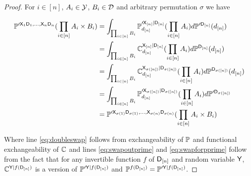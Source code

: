 \begin{proof}
For $i\in [n]$, $A_i\in \mathcal{Y}$, $B_i\in \mathcal{D}$ and arbitrary permutation $\sigma$ we have

\begin{align}
    \mathbb{P}^{\prime \mathsf{X}_{1}\mathsf{D}_1,...,\mathsf{X}_n\mathsf{D}_n}(\prod_{i\in[n]} A_i\times B_i) &= \int_{\prod_{i\in[n]}B_i} \mathbb{P}^{\prime \mathsf{X}_{[n]}|\mathsf{D}_{[n]}}_{d_{[n]}}(\prod_{i\in[n]} A_i) d\mathbb{P}^{\prime \mathsf{D}_{[n]}}(d_{[n]})\\
                                                                                             &= \int_{\prod_{i\in[n]}B_i} \mathbb{C}^{\mathsf{X}_{[n]}|\mathsf{D}_{[n]}}_{d_{[n]}}(\prod_{i\in[n]} A_i) d\mathbb{P}^{\mathsf{D}_{[n]}}(d_{[n]})\label{eq:swapoutprime}\\
                                                                                             &= \int_{\prod_{i\in[n]}B_i} \mathbb{C}^{\mathsf{X}_{\sigma([n])}|\mathsf{D}_{\sigma([n])}}_{d_{[n]}}(\prod_{i\in[n]} A_i) d\mathbb{P}^{\mathsf{D}_{\sigma([n])}}(d_{[n]})\label{eq:doubleswap}\\
                                                                                             &= \int_{\prod_{i\in[n]}B_i} \mathbb{P}^{\prime \mathsf{X}_{\sigma([n])}|\mathsf{D}_{\sigma([n])}}_{d_{[n]}}(\prod_{i\in[n]} A_i) d\mathbb{P}^{\prime \mathsf{D}_{\sigma([n])}}\label{eq:swapforpprime}\\
                                                                                             &= \mathbb{P}^{\prime \mathsf{X}_{\sigma(1)}\mathsf{D}_{\sigma(1)},...,\mathsf{X}_{\sigma(n)}\mathsf{D}_{\sigma(n)}}(\prod_{i\in[n]} A_i\times B_i)
\end{align}

Where line \ref{eq:doubleswap} follows from exchangeability of $\mathbb{P}$ and functional exchangeability of $\mathbb{C}$ and lines \ref{eq:swapoutprime} and \ref{eq:swapforpprime} follow from the fact that for any invertible function $f$ of $\mathsf{D}_{[n]}$ and random variable $\mathsf{Y}$, $\mathbb{C}^{\mathsf{Y}|f(\mathsf{D}_{[n]})}$ is a version of $\mathbb{P}^{\prime \mathsf{Y}|f(\mathsf{D}_{[n]})}$ and $\mathbb{P}^{f(\mathsf{D}_{[n]})}=\mathbb{P}^{\prime \mathsf{Y}|f(\mathsf{D}_{[n]})}$.
\end{proof}

